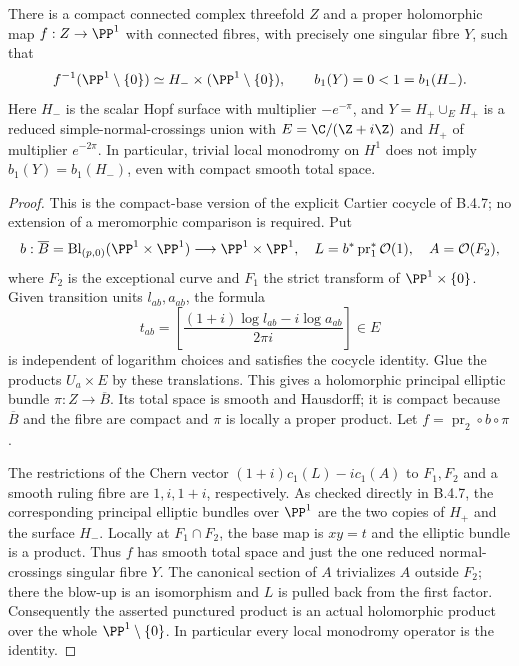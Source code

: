 \begin{proposition}\label{push:src:B.4.17}
There is a compact connected complex threefold $Z$ and a proper
holomorphic map $f:Z\to\PP^1$ with connected fibres, with precisely
one singular fibre $Y$, such that
\[
 f^{-1}(\PP^1\setminus\{0\})
 \simeq H_-\times(\PP^1\setminus\{0\}),\qquad
 b_1(Y)=0<1=b_1(H_-).
\]
Here $H_-$ is the scalar Hopf surface with multiplier $-e^{-\pi}$,
and $Y=H_+\cup_E H_+$ is a reduced simple-normal-crossings union
with $E=\C/(\Z+i\Z)$ and $H_+$ of multiplier $e^{-2\pi}$.
In particular, trivial local monodromy on $H^1$ does not imply
$b_1(Y)=b_1(H_-)$, even with compact smooth total space.
\end{proposition}
\begin{proof}
This is the compact-base version of the explicit Cartier cocycle
of B.4.7; no extension of a meromorphic comparison is required.
Put
\[
 b:\overline B=\operatorname{Bl}_{(p,0)}(\PP^1\times\PP^1)
      \longrightarrow\PP^1\times\PP^1,
 \quad L=b^*\operatorname{pr}_1^*\mathcal O(1),
 \quad A=\mathcal O(F_2),
\]
where $F_2$ is the exceptional curve and $F_1$ the strict transform
of $\PP^1\times\{0\}$.  Given transition units $l_{ab},a_{ab}$,
the formula
\[
 t_{ab}=\left[
 \frac{(1+i)\log l_{ab}-i\log a_{ab}}{2\pi i}
 \right]\in E
\]
is independent of logarithm choices and satisfies the cocycle
identity.  Glue the products $U_a\times E$ by these translations.
This gives a holomorphic principal elliptic bundle
$\pi:Z\to\overline B$.  Its total space is smooth and Hausdorff;
it is compact because $\overline B$ and the fibre are compact and
$\pi$ is locally a proper product.  Let
$f=\operatorname{pr}_2\circ b\circ\pi$.

The restrictions of the Chern vector
$(1+i)c_1(L)-i c_1(A)$ to $F_1,F_2$ and a smooth ruling fibre
are $1,i,1+i$, respectively.  As checked directly in B.4.7,
the corresponding principal elliptic bundles over $\PP^1$
are the two copies of $H_+$ and the surface $H_-$.  Locally
at $F_1\cap F_2$, the base map is $xy=t$ and the elliptic
bundle is a product.  Thus $f$ has smooth total space and just
the one reduced normal-crossings singular fibre $Y$.
The canonical section of $A$ trivializes $A$ outside $F_2$;
there the blow-up is an isomorphism and $L$ is pulled back
from the first factor.  Consequently the asserted punctured
product is an actual holomorphic product over the whole
$\PP^1\setminus\{0\}$.  In particular every local monodromy
operator is the identity.


\end{proof}
